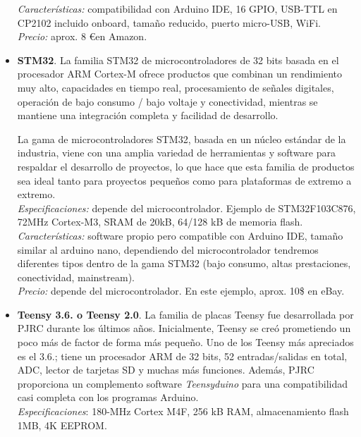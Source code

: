 \documentclass[12pt]{article}
\begin{document}
\begin{itemize}
		\textit{Características:} compatibilidad con Arduino IDE, 16 GPIO, USB-TTL en CP2102 incluido onboard, tamaño reducido, puerto micro-USB, WiFi.\\
		
		\textit{Precio:} aprox. 8 \euro \enspace en Amazon.\\
	
		\item \textbf{STM32}. La familia STM32 de microcontroladores de 32 bits basada en el procesador ARM Cortex-M ofrece productos que combinan un rendimiento muy alto, capacidades en tiempo real, procesamiento de señales digitales, operación de bajo consumo / bajo voltaje y conectividad, mientras se mantiene una integración completa y facilidad de desarrollo.
		
		La gama de microcontroladores STM32, basada en un núcleo estándar de la industria, viene con una amplia variedad de herramientas y software para respaldar el desarrollo de proyectos, lo que hace que esta familia de productos sea ideal tanto para proyectos pequeños como para plataformas de extremo a extremo. \\
		
		\textit{Especificaciones:} depende del microcontrolador. Ejemplo de STM32F103C876, 72MHz Cortex-M3, SRAM de 20kB, 64/128 kB de memoria flash. \\
		
		\textit{Características:} software propio pero compatible con Arduino IDE, tamaño similar al arduino nano, dependiendo del microcontrolador tendremos diferentes tipos dentro de la gama STM32 (bajo consumo, altas prestaciones, conectividad, mainstream). \\
		
		\textit{Precio:} depende del microcontrolador. En este ejemplo, aprox. 10\$ en eBay. \\
		
		\item \textbf{Teensy 3.6. o Teensy 2.0}. La familia de placas Teensy fue desarrollada por PJRC durante los últimos años. Inicialmente, Teensy se creó prometiendo un poco más de factor de forma más pequeño. Uno de los Teensy más apreciados es el 3.6.; tiene un procesador ARM de 32 bits, 52 entradas/salidas en total, ADC, lector de tarjetas SD y muchas más funciones. Además, PJRC proporciona un complemento software \textit{Teensyduino} para una compatibilidad casi completa con los programas Arduino. \\ 
		
		\textit{Especificaciones}: 180-MHz Cortex M4F, 256 kB RAM, almacenamiento flash 1MB, 4K EEPROM. \\
		

\end{itemize}
\end{document}
